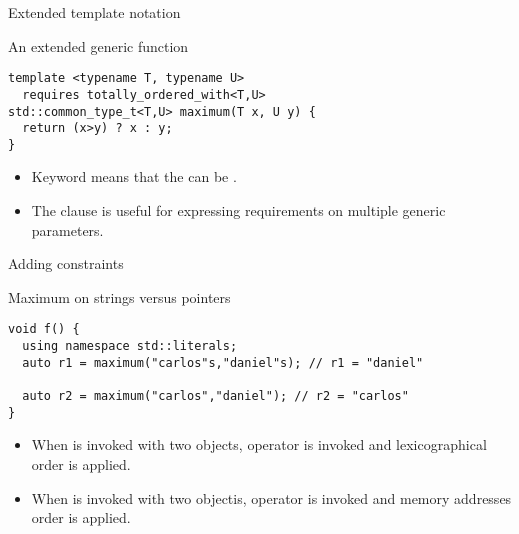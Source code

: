 \begin{frame}[t,fragile]{Extended template notation}
\begin{block}{An extended generic function}
\begin{lstlisting}
template <typename T, typename U>
  requires totally_ordered_with<T,U>
std::common_type_t<T,U> maximum(T x, U y) {
  return (x>y) ? x : y;
}
\end{lstlisting}
\end{block}

\begin{itemize}
  \item Keyword  means that the  can be
        .

  \item The  clause is useful for expressing requirements on multiple
        generic parameters.
\end{itemize}

\end{frame}

\begin{frame}[t,fragile]{Adding constraints}

\begin{block}{Maximum on strings versus pointers}
\begin{lstlisting}
void f() {
  using namespace std::literals;
  auto r1 = maximum("carlos"s,"daniel"s); // r1 = "daniel"

  auto r2 = maximum("carlos","daniel"); // r2 = "carlos"
}  
\end{lstlisting}
\end{block}

\begin{itemize}
  \item When  is invoked with two  objects,
        operator \cppkey{<} is invoked and lexicographical order is applied.

  \item When  is invoked with two  objectis,
        operator \cppkey{<} is invoked and memory addresses order is applied.
\end{itemize}

\end{frame}


